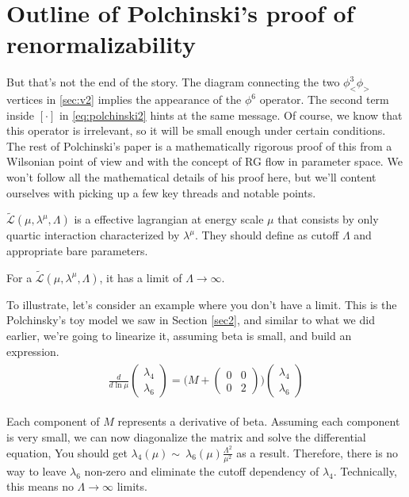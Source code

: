 \documentclass[12pt,halfline,a4paper]{ouparticle}
\begin{document}
\section{Outline of Polchinski's proof of renormalizability}
But that's not the end of the story. The diagram connecting the two $\phi_<^3\phi_>$ vertices in \ref{sec:v2} implies the appearance of the $\phi^6$ operator. The second term inside $[\cdot]$ in \ref{eq:polchinski2} hints at the same message.
Of course, we know that this operator is irrelevant, so it will be small enough under certain conditions. The rest of Polchinski's paper is a mathematically rigorous proof of this from a Wilsonian point of view and with the concept of RG flow in parameter space.
We won't follow all the mathematical details of his proof here, but we'll content ourselves with picking up a few key threads and notable points.
\begin{definition}
	$\tilde{\mathcal L}(\mu,\lambda^\mu,\Lambda)$ is a effective lagrangian at energy scale $\mu$ that consists by only quartic interaction characterized by $\lambda^\mu$. They should define as cutoff $\Lambda$ and appropriate bare parameters.
\end{definition}
\begin{theorem}
	\label{thm:renormalizability}
	For a $\tilde{\mathcal L}(\mu,\lambda^\mu,\Lambda)$, it has a limit of $\Lambda\rightarrow\infty$.
\end{theorem}
To illustrate, let's consider an example where you don't have a limit. This is the Polchinsky's toy model we saw in Section \ref{sec2}, and similar to what we did earlier, we're going to linearize it, assuming beta is small, and build an expression.
\begin{align}
	\begin{split}
		\frac{d}{d\ln \mu}\begin{pmatrix}
			\lambda_4\\\lambda_6
		\end{pmatrix}=\bigg(M+\begin{pmatrix}
			0&0\\0&2
		\end{pmatrix}\bigg)	\begin{pmatrix}
			\lambda_4\\\lambda_6
		\end{pmatrix}
	\end{split}
\end{align}

Each component of $M$ represents a derivative of beta. Assuming each component is very small, we can now diagonalize the matrix and solve the differential equation, You should get $\lambda_4(\mu)\sim~\lambda_6(\mu)\frac{\Lambda^2}{\mu^2}$ as a result.
Therefore, there is no way to leave $\lambda_6$ non-zero and eliminate the cutoff dependency of $\lambda_4$. Technically, this means no $\Lambda\rightarrow\infty$ limits.
\end{document}
